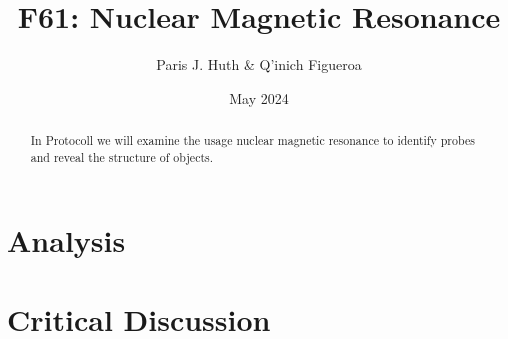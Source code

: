\documentclass[11 pt]{article}
\title{F61: Nuclear Magnetic Resonance}
\author{Paris J. Huth \& Q'inich Figueroa}
\date{May 2024}
\begin{document}
\maketitle
\begin{center}
\begin{abstract}
In Protocoll we will examine the usage nuclear magnetic resonance to identify probes and reveal the structure of objects.
\end{abstract}
\end{center}




\section{Analysis}
\section{Critical Discussion}
\end{document}
